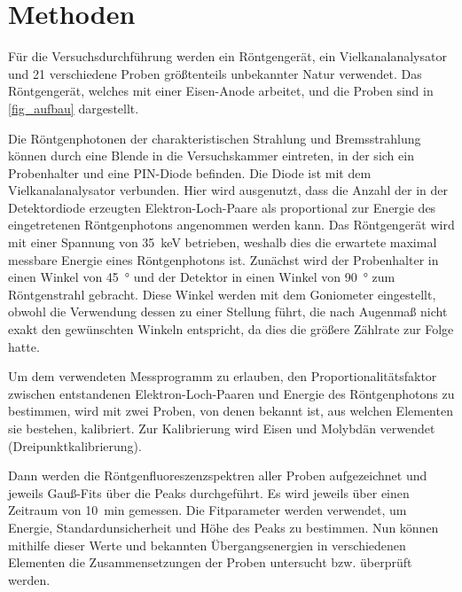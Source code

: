 \documentclass[
	a4paper,
	12pt,
	pagesize,
	ngerman
]{scrartcl}
\begin{document}
	\section{Methoden}
	Für die Versuchsdurchführung werden ein Röntgengerät, ein Vielkanalanalysator und 21 verschiedene Proben größtenteils unbekannter Natur verwendet.
	Das Röntgengerät, welches mit einer Eisen-Anode arbeitet, und die Proben sind in \cref{fig_aufbau} dargestellt.

	Die Röntgenphotonen der charakteristischen Strahlung und Bremsstrahlung können durch eine Blende in die Versuchskammer eintreten, in der sich ein Probenhalter und eine PIN-Diode befinden.
	Die Diode ist mit dem Vielkanalanalysator verbunden.
	Hier wird ausgenutzt, dass die Anzahl der in der Detektordiode erzeugten Elektron-Loch-Paare als proportional zur Energie des eingetretenen Röntgenphotons angenommen werden kann.
	Das Röntgengerät wird mit einer Spannung von \SI{35}{\kilo \electronvolt} betrieben, weshalb dies die erwartete maximal messbare Energie eines Röntgenphotons ist.
	Zunächst wird der Probenhalter in einen Winkel von \SI{45}{\degree} und der Detektor in einen Winkel von \SI{90}{\degree} zum Röntgenstrahl gebracht.
	Diese Winkel werden mit dem Goniometer eingestellt, obwohl die Verwendung dessen zu einer Stellung führt, die nach Augenmaß nicht exakt den gewünschten Winkeln entspricht, da dies die größere Zählrate zur Folge hatte.

	Um dem verwendeten Messprogramm zu erlauben, den Proportionalitätsfaktor zwischen entstandenen Elektron-Loch-Paaren und Energie des Röntgenphotons zu bestimmen, wird mit zwei Proben, von denen bekannt ist, aus welchen Elementen sie bestehen, kalibriert.
	Zur Kalibrierung wird Eisen und Molybdän verwendet (Dreipunktkalibrierung).

	Dann werden die Röntgenfluoreszenzspektren aller Proben aufgezeichnet und jeweils Gauß-Fits über die Peaks durchgeführt.
	Es wird jeweils über einen Zeitraum von \SI{10}{\minute} gemessen.
	Die Fitparameter werden verwendet, um Energie, Standardunsicherheit und Höhe des Peaks zu bestimmen.
	Nun können mithilfe dieser Werte und bekannten Übergangsenergien in verschiedenen Elementen die Zusammensetzungen der Proben untersucht bzw. überprüft werden.
\end{document}
